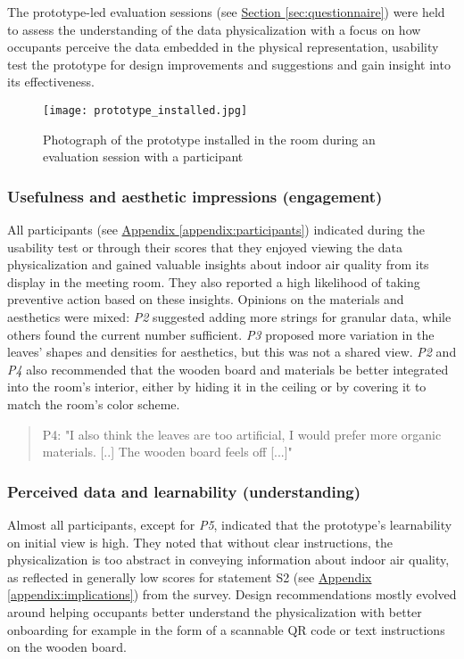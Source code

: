 The prototype-led evaluation sessions (see \hyperref[sec:questionnaire]{Section \ref*{sec:questionnaire}}) were held to assess the understanding of the data physicalization with a focus on how occupants perceive the data embedded in the physical representation, usability test the prototype for design improvements and suggestions and gain insight into its effectiveness.

\begin{figure}[b]
    \centering
    \texttt{[image: prototype\_installed.jpg]}
    \caption{Photograph of the prototype installed in the room during an evaluation session with a participant }
    \label{fig:complexity}
\end{figure}

\subsubsection{Usefulness and aesthetic impressions (engagement)}

All participants (see \hyperref[appendix:participants]{Appendix \ref*{appendix:participants}}) indicated during the usability test or through their scores that they enjoyed viewing the data physicalization and gained valuable insights about indoor air quality from its display in the meeting room. They also reported a high likelihood of taking preventive action based on these insights. Opinions on the materials and aesthetics were mixed: \textit{P2} suggested adding more strings for granular data, while others found the current number sufficient. \textit{P3} proposed more variation in the leaves' shapes and densities for aesthetics, but this was not a shared view. \textit{P2} and \textit{P4} also recommended that the wooden board and materials be better integrated into the room's interior, either by hiding it in the ceiling or by covering it to match the room's color scheme.

\begin{quote}
P4: "I also think the leaves are too artificial, I would prefer more organic materials. [..] The wooden board feels off [...]"
\end{quote}

\subsubsection{Perceived data and learnability (understanding)}
Almost all participants, except for \textit{P5}, indicated that the prototype's learnability on initial view is high. They noted that without clear instructions, the physicalization is too abstract in conveying information about indoor air quality, as reflected in generally low scores for statement S2 (see \hyperref[appendix:implications]{Appendix \ref*{appendix:implications}}) from the survey. Design recommendations mostly evolved around helping occupants better understand the physicalization with better onboarding for example in the form of a scannable QR code or text instructions on the wooden board.

